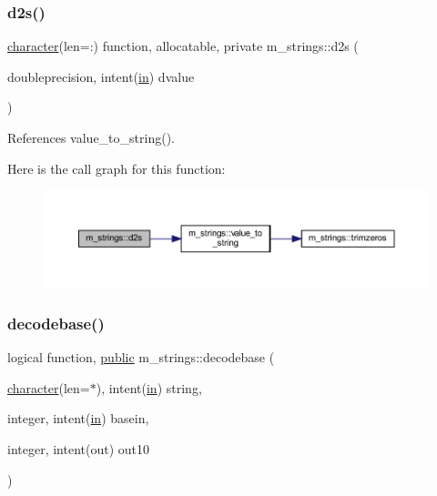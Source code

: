 \subsubsection{\texorpdfstring{d2s()}{d2s()}}
{\footnotesize\ttfamily \hyperlink{option__stopwatch_83_8txt_abd4b21fbbd175834027b5224bfe97e66}{character}(len=\+:) function, allocatable, private m\+\_\+strings\+::d2s (\begin{DoxyParamCaption}\item[{doubleprecision, intent(\hyperlink{M__journal_83_8txt_afce72651d1eed785a2132bee863b2f38}{in})}]{dvalue }\end{DoxyParamCaption})\hspace{0.3cm}{\ttfamily [private]}}



References value\+\_\+to\+\_\+string().

Here is the call graph for this function\+:
\nopagebreak
\begin{figure}[H]
\begin{center}
\leavevmode
\includegraphics[width=350pt]{namespacem__strings_ae4fac72ec3065d73aa06a107e41004b7_cgraph}
\end{center}
\end{figure}
\mbox{\label{namespacem__strings_a90f3bdfa02c8ddff42cb15e66b124fe8}} 
\subsubsection{\texorpdfstring{decodebase()}{decodebase()}}
{\footnotesize\ttfamily logical function, \hyperlink{M__stopwatch_83_8txt_a2f74811300c361e53b430611a7d1769f}{public} m\+\_\+strings\+::decodebase (\begin{DoxyParamCaption}\item[{\hyperlink{option__stopwatch_83_8txt_abd4b21fbbd175834027b5224bfe97e66}{character}(len=$\ast$), intent(\hyperlink{M__journal_83_8txt_afce72651d1eed785a2132bee863b2f38}{in})}]{string,  }\item[{integer, intent(\hyperlink{M__journal_83_8txt_afce72651d1eed785a2132bee863b2f38}{in})}]{basein,  }\item[{integer, intent(out)}]{out10 }\end{DoxyParamCaption})}



